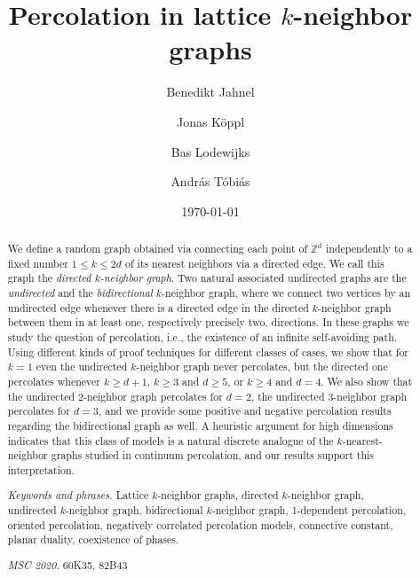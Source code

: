 \documentclass[a4paper, oneside, 11pt]{amsart}
\title{Percolation in lattice $k$-neighbor graphs}
\date{\today}
\author{Benedikt Jahnel}
\author{Jonas K\"oppl}
\author{Bas Lodewijks}
\author{Andr\'as T\'obi\'as}
\theoremstyle{definition}
\newcommand{\1}{\mathbbm{1}}
\newcommand{\0}{\mathbf{o}}
\newcommand{\Z}{\mathbb{Z}}
\numberwithin{equation}{section}
\begin{document}
\maketitle

\begin{abstract}
We define a random graph obtained via connecting each point of $\Z^d$ independently to a fixed number $1 \leq k \leq 2d$ of its nearest neighbors via a directed edge. We call this graph the \emph{directed $k$-neighbor graph}. Two natural associated undirected graphs are the \emph{undirected} and the \emph{bidirectional} $k$-neighbor graph, where we connect two vertices by an undirected edge whenever there is a directed edge in the directed $k$-neighbor graph between them in at least one, respectively precisely two, directions. In these graphs we study the question of percolation, i.e., the existence of an infinite self-avoiding path. Using different kinds of proof techniques for different classes of cases, we show that for $k=1$ even the undirected $k$-neighbor graph never percolates, but the directed one percolates whenever $k \geq d+1$, $k \geq 3$ and $d \geq 5$, or $k \geq 4$ and $d=4$. We also show that the undirected $2$-neighbor graph percolates for $d=2$, the undirected $3$-neighbor graph percolates for $d=3$, and we provide some positive and negative percolation results regarding the bidirectional graph as well. A heuristic argument for high dimensions indicates that this class of models is a natural discrete analogue of the $k$-nearest-neighbor graphs studied in continuum percolation, and our results support this interpretation.

\smallskip

\emph{Keywords and phrases.} Lattice $k$-neighbor graphs, directed $k$-neighbor graph, undirected $k$-neighbor graph, bidirectional $k$-neighbor graph, 1-dependent percolation, oriented percolation, negatively correlated percolation models, connective constant, planar duality, coexistence of phases.

\smallskip

\emph{MSC 2020.} 60K35, 82B43
\end{abstract}
\end{document}
